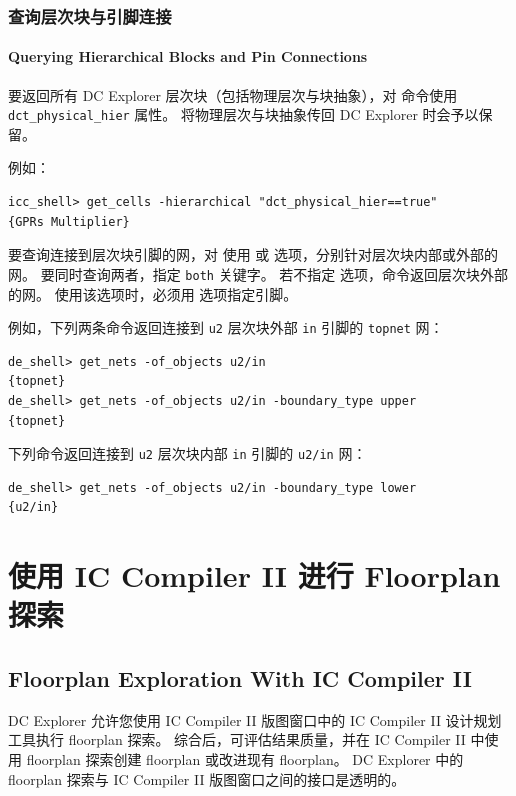 \subsubsection{查询层次块与引脚连接}
\paragraph*{Querying Hierarchical Blocks and Pin Connections}

要返回所有 DC Explorer 层次块（包括物理层次与块抽象），对  命令使用 \texttt{dct\_physical\_hier} 属性。
将物理层次与块抽象传回 DC Explorer 时会予以保留。

例如：
\begin{lstlisting}
icc_shell> get_cells -hierarchical "dct_physical_hier==true"
{GPRs Multiplier}
\end{lstlisting}

要查询连接到层次块引脚的网，对  使用  或  选项，分别针对层次块内部或外部的网。
要同时查询两者，指定 \texttt{both} 关键字。
若不指定  选项，命令返回层次块外部的网。
使用该选项时，必须用  选项指定引脚。

例如，下列两条命令返回连接到 \texttt{u2} 层次块外部 \texttt{in} 引脚的 \texttt{topnet} 网：
\begin{lstlisting}
de_shell> get_nets -of_objects u2/in
{topnet}
de_shell> get_nets -of_objects u2/in -boundary_type upper
{topnet}
\end{lstlisting}

下列命令返回连接到 \texttt{u2} 层次块内部 \texttt{in} 引脚的 \texttt{u2/in} 网：
\begin{lstlisting}
de_shell> get_nets -of_objects u2/in -boundary_type lower
{u2/in}
\end{lstlisting}

\section{使用 IC Compiler II 进行 Floorplan 探索}
\subsection*{Floorplan Exploration With IC Compiler II}

DC Explorer 允许您使用 IC Compiler II 版图窗口中的 IC Compiler II 设计规划工具执行 floorplan 探索。
综合后，可评估结果质量，并在 IC Compiler II 中使用 floorplan 探索创建 floorplan 或改进现有 floorplan。
DC Explorer 中的 floorplan 探索与 IC Compiler II 版图窗口之间的接口是透明的。

